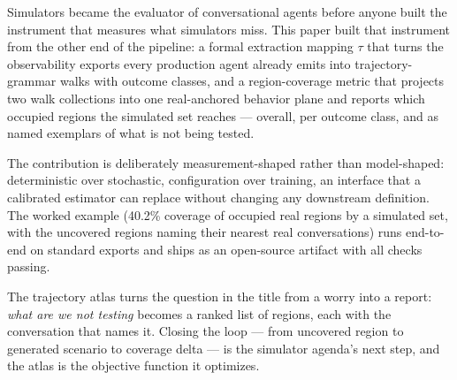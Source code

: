 Simulators became the evaluator of conversational agents before anyone built the instrument
that measures what simulators miss.
This paper built that instrument from the other end of the pipeline: a formal extraction
mapping $\tau$ that turns the observability exports every production agent already emits into
trajectory-grammar walks with outcome classes, and a region-coverage metric that projects two
walk collections into one real-anchored behavior plane and reports which occupied regions the
simulated set reaches --- overall, per outcome class, and as named exemplars of what is not
being tested.

The contribution is deliberately measurement-shaped rather than model-shaped: deterministic
over stochastic, configuration over training, an interface that a calibrated estimator can
replace without changing any downstream definition.
The worked example (40.2\% coverage of occupied real regions by a simulated set, with the
uncovered regions naming their nearest real conversations) runs end-to-end on standard
exports and ships as an open-source artifact with all checks passing.

The trajectory atlas turns the question in the title from a worry into a report:
\emph{what are we not testing} becomes a ranked list of regions, each with the conversation
that names it.
Closing the loop --- from uncovered region to generated scenario to coverage delta --- is the
simulator agenda's next step, and the atlas is the objective function it optimizes.
